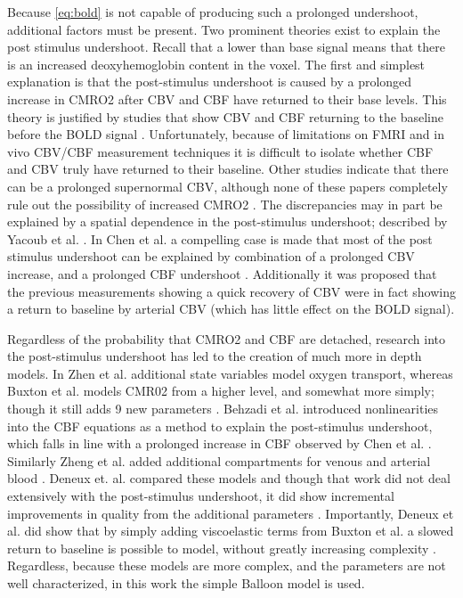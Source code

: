 Because \autoref{eq:bold} is not capable of producing such a prolonged undershoot,
additional factors must be present. Two prominent theories exist to explain the post 
stimulus undershoot.  Recall
that a lower than base signal means that there is an increased deoxyhemoglobin
content in the voxel. The first and simplest explanation is that the post-stimulus
undershoot is caused by a prolonged increase in CMRO2 after CBV and CBF
have returned to their base levels. This theory is justified by 
studies that show CBV and CBF returning to the baseline before the BOLD signal
\cite{Frahm2008, Donahue2009, Buxton2004, Lu2004, Shen2008}. 
Unfortunately, because of limitations on FMRI and in vivo
CBV/CBF measurement techniques it is difficult to isolate whether CBF and
CBV truly have returned to their baseline. Other studies indicate
that there can be a prolonged supernormal CBV, although none of these papers completely
rule out the possibility of increased CMRO2  \cite{Mandeville1999a,
Behzadi2005, Chen2009a}. The discrepancies may in part
be explained by a spatial dependence in the post-stimulus undershoot; described
by Yacoub et al. \cite{Yacoub2006}. In Chen et al. 
a compelling case is made that most of the post stimulus undershoot can be 
explained by combination of a prolonged CBV increase, and a prolonged CBF 
undershoot \cite{Chen2009}. Additionally it was proposed that
the previous measurements showing a quick recovery of CBV 
were in fact showing a return to baseline by arterial CBV (which
has little effect on the BOLD signal).

Regardless of the probability that CMRO2 and CBF are detached,
research into the post-stimulus undershoot has led to the creation
of much more in depth models. In Zhen et al. additional state
variables model oxygen transport, whereas Buxton et al. models
CMR02 from a higher level, and somewhat more simply; though it 
still adds 9 new parameters \cite{Zheng2002, Buxton2004}. Behzadi et al. 
introduced nonlinearities into the CBF equations as a method to
explain the post-stimulus undershoot, which falls in line with a 
prolonged increase in CBF observed by Chen et al. \cite{Behzadi2005, Chen2009}. 
Similarly Zheng et al. added additional compartments for 
venous and arterial blood \cite{Zheng2005}. 
Deneux et. al. compared these models and though 
that work did not deal extensively with the 
post-stimulus undershoot, it did show incremental improvements
in quality from the additional parameters \cite{Deneux2006}.  
Importantly, Deneux et al. did show that by 
simply adding viscoelastic terms from Buxton et al. a slowed return 
to baseline is possible to model, without greatly increasing
complexity \cite{Deneux2006, Buxton2004}. Regardless, because these models are more 
complex, and the parameters are not well characterized, in this work the simple
Balloon model is used. 

